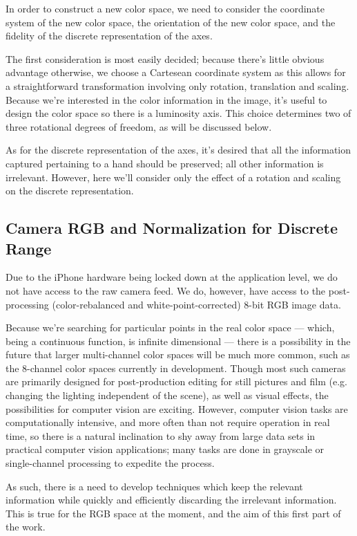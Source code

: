 In order to construct a new color space, we need to consider the coordinate system of the new color space, the orientation of the new color space, and the fidelity of the discrete representation of the axes.

The first consideration is most easily decided; because there's little obvious advantage otherwise, we choose a Cartesean coordinate system as this allows for a straightforward transformation involving only rotation, translation and scaling. Because we're interested in the color information in the image, it's useful to design the color space so there is a luminosity axis. This choice determines two of three rotational degrees of freedom, as will be discussed below.

As for the discrete representation of the axes, it's desired that all the information captured pertaining to a hand should be preserved; all other information is irrelevant. However, here we'll consider only the effect of a rotation and scaling on the discrete representation.


\subsection{Camera RGB and Normalization for Discrete Range}\label{sec:CameraRGB}

Due to the iPhone hardware being locked down at the application level, we do not have access to the raw camera feed. We do, however, have access to the post-processing (color-rebalanced and white-point-corrected) 8-bit RGB image data.

Because we're searching for particular points in the real color space --- which, being a continuous function, is infinite dimensional --- there is a possibility in the future that larger multi-channel color spaces will be much more common, such as the 8-channel color spaces currently in development. Though most such cameras are primarily designed for post-production editing for still pictures and film (e.g. changing the lighting independent of the scene), as well as visual effects, the possibilities for computer vision are exciting. However, computer vision tasks are computationally intensive, and more often than not require operation in real time, so there is a natural inclination to shy away from large data sets in practical computer vision applications; many tasks are done in grayscale or single-channel processing to expedite the process.

As such, there is a need to develop techniques which keep the relevant information while quickly and efficiently discarding the irrelevant information. This is true for the RGB space at the moment, and the aim of this first part of the work.



